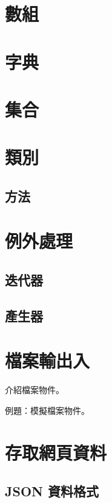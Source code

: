 \documentclass[a4paper,12pt]{book}
\theoremstyle{definition}
\begin{document}
\chapter{數組}
%
\label{c:tuple}

\chapter{字典}
%
\label{c:dict}

\chapter{集合}
%
\label{c:set}

\chapter{類別}
%
\label{c:class}

\section{方法}

\chapter{例外處理}
%
\label{c:exception}

\section{迭代器}

\section{產生器}

\chapter{檔案輸出入}
%
\label{c:file}

介紹檔案物件。

例題：模擬檔案物件。

\chapter{存取網頁資料}
%
\label{c:web}

\section{JSON 資料格式}
\end{document}
